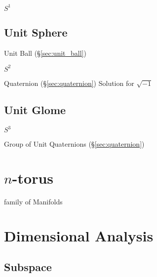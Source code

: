 $S^1$



\subsection{Unit Sphere}\label{sec:unit_sphere}

Unit Ball (\S\ref{sec:unit_ball})

$S^2$

Quaternion (\S\ref{sec:quaternion}) Solution for $\sqrt{-1}$



\subsection{Unit Glome}\label{sec:unit_glome}

$S^3$

Group of Unit Quaternions (\S\ref{sec:quaternion})



\section{$n$-torus}\label{sec:n_torus}

family of Manifolds



\section{Dimensional Analysis}\label{sec:dimensional_analysis}

\subsection{Subspace}\label{sec:subspace}


